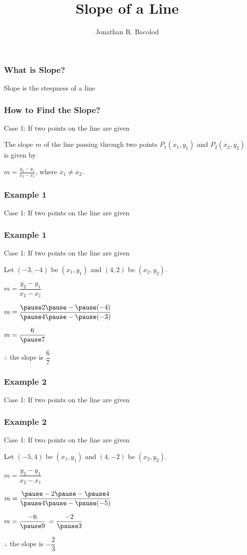 \documentclass[14pt]{beamer}
\title[] {Slope of a Line}
\author{Jonathan R. Bacolod}
\institute[SHS]{Sauyo High School}
\date{}
\begin{document}
	\frame{\titlepage}
	
	\begin{frame}
		\frametitle{What is Slope?}
		Slope is the steepness of a line
	\end{frame}

    \begin{frame}
    	\frametitle{How to Find the Slope?}
    	Case 1: If two points on the line are given
    	
    	\vone
    	
    	The slope $ m $  of the line passing through two points $ P_1(x_1, y_1) $   and $ P_2(x_2, y_2) $  is given by
    	\begin{center}
    		$ m = \displaystyle  \frac{y_2-y_1}{x_2-x_1}$, where  $ x_1 \neq x_2 $.
    	\end{center} 
    \end{frame}

    \begin{frame}
    \frametitle{Example 1}
    Case 1: If two points on the line are given
    
    \end{frame}

    \begin{frame}
    	\frametitle{Example 1}
    	Case 1: If two points on the line are given
    	
    	\vone
    	
    	Let $ (-3, -4) $ be $ (x_1, y_1) $ and $ (4, 2) $ be $ (x_2, y_2) $.
    	
    	\pause \vhalf $ m = \dfrac{y_2-y_1}{x_2-x_1}$
    	
    	\pause \vhalf $ m = \dfrac{\pause 2 \pause - \pause (-4)}{\pause 4 \pause - \pause (-3)}$
    	
    	\pause \vhalf $ m = \dfrac{6}{\pause 7}$
    	
    	\pause \vhalf $ \therefore $ the slope is  $ \dfrac{6}{7} $
    	
    \end{frame}

    \begin{frame}
    	\frametitle{Example 2}
    	Case 1: If two points on the line are given
    	
    \end{frame}
    
    \begin{frame}
    	\frametitle{Example 2}
    	Case 1: If two points on the line are given
    	
    	\vone
    	
    	Let $ (-5, 4) $ be $ (x_1, y_1) $ and $ (4, -2) $ be $ (x_2, y_2) $.
    	
    	\pause \vhalf $ m = \dfrac{y_2-y_1}{x_2-x_1}$
    	
    	\pause \vhalf $ m = \dfrac{\pause -2 \pause - \pause 4}{\pause 4 \pause - \pause (-5)}$
    	
    	\pause \vhalf $ m = \dfrac{-6}{\pause 9}$
    	\pause $ = \dfrac{-2}{\pause 3}$
    	
    	\pause \vhalf $ \therefore $ the slope is  $ -\dfrac{2}{3} $
    	
    \end{frame}
\end{document}
